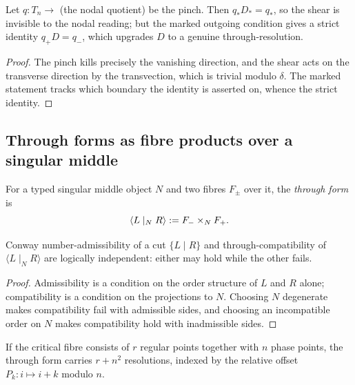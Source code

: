 \begin{proposition}\label{prop:marked-identity}
Let $q\colon T_n\to$ (the nodal quotient) be the pinch.  Then $q_\ast D_\ast=q_\ast$, so
the shear is invisible to the nodal reading; but the marked outgoing condition gives a
strict identity $q_+D=q_-$, which upgrades $D$ to a genuine through-resolution.
\end{proposition}

\begin{proof}
The pinch kills precisely the vanishing direction, and the shear acts on the transverse
direction by the transvection, which is trivial modulo $\delta$.  The marked statement
tracks which boundary the identity is asserted on, whence the strict identity.
\end{proof}

\subsection{Through forms as fibre products over a singular middle}

\begin{definition}\label{def:through-form}
For a typed singular middle object $N$ and two fibres $F_\pm$ over it, the \emph{through
form} is
\[
  \langle L\mid_N R\rangle \mathrel{:=} F_-\times_N F_+ .
\]
\end{definition}

\begin{proposition}\label{prop:order-compat-independent}
Conway number-admissibility of a cut $\{L\mid R\}$ and through-compatibility of
$\langle L\mid_N R\rangle$ are logically independent: either may hold while the other
fails.
\end{proposition}

\begin{proof}
Admissibility is a condition on the order structure of $L$ and $R$ alone; compatibility
is a condition on the projections to $N$.  Choosing $N$ degenerate makes compatibility
fail with admissible sides, and choosing an incompatible order on $N$ makes compatibility
hold with inadmissible sides.
\end{proof}

\begin{proposition}\label{prop:resolution-count}
If the critical fibre consists of $r$ regular points together with $n$ phase points,
the through form carries $r+n^{2}$ resolutions, indexed by the relative offset
$P_k\colon i\mapsto i+k$ modulo $n$.
\end{proposition}

